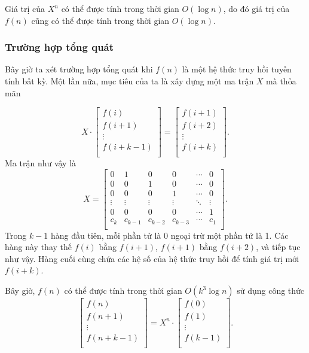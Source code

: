 Giá trị của $X^n$ có thể được tính trong
thời gian $O(\log n)$,
do đó giá trị của $f(n)$ cũng có thể được tính
trong thời gian $O(\log n)$.

\subsubsection{Trường hợp tổng quát}

Bây giờ ta xét trường hợp tổng quát khi
$f(n)$ là một hệ thức truy hồi tuyến tính bất kỳ.
Một lần nữa, mục tiêu của ta là xây dựng một ma trận $X$
mà thỏa mãn

\[ X \cdot
 \begin{bmatrix}
  f(i) \\
  f(i+1) \\
  \vdots \\
  f(i+k-1) \\
 \end{bmatrix}
=
 \begin{bmatrix}
  f(i+1) \\
  f(i+2) \\
  \vdots \\
  f(i+k) \\
 \end{bmatrix}.
\]
Ma trận như vậy là
\[
X =
 \begin{bmatrix}
  0 & 1 & 0 & 0 & \cdots & 0 \\
  0 & 0 & 1 & 0 & \cdots & 0 \\
  0 & 0 & 0 & 1 & \cdots & 0 \\
  \vdots & \vdots & \vdots & \vdots & \ddots & \vdots \\
  0 & 0 & 0 & 0 & \cdots & 1 \\
  c_k & c_{k-1} & c_{k-2} & c_{k-3} & \cdots & c_1 \\
 \end{bmatrix}.
\]
Trong $k-1$ hàng đầu tiên, mỗi phần tử là 0
ngoại trừ một phần tử là 1.
Các hàng này thay thế $f(i)$ bằng $f(i+1)$,
$f(i+1)$ bằng $f(i+2)$, và tiếp tục như vậy.
Hàng cuối cùng chứa các hệ số của hệ thức truy hồi
để tính giá trị mới $f(i+k)$.

\begin{samepage}
Bây giờ, $f(n)$ có thể được tính trong
thời gian $O(k^3 \log n)$ sử dụng công thức
\[
 \begin{bmatrix}
  f(n) \\
  f(n+1) \\
  \vdots \\
  f(n+k-1) \\
 \end{bmatrix}
=
X^n \cdot
 \begin{bmatrix}
  f(0) \\
  f(1) \\
  \vdots \\
  f(k-1) \\
 \end{bmatrix}.
\]
\end{samepage}


